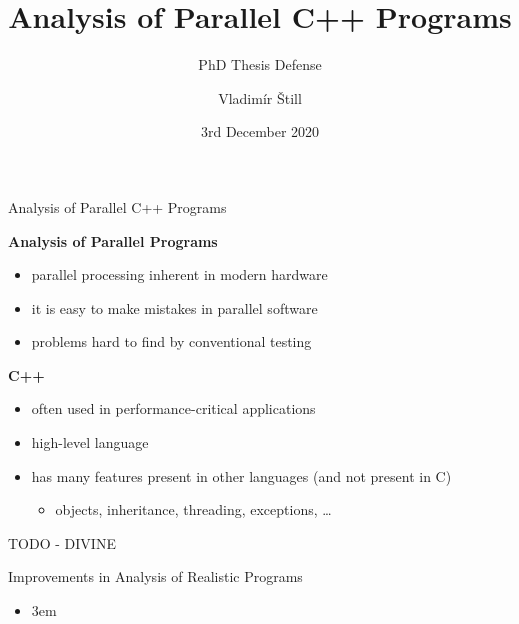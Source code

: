 \documentclass[aspectratio=169]{paradise-slide}
\title{Analysis of Parallel C++ Programs}
\subtitle{PhD Thesis Defense}
\author{Vladimír Štill}
\date{3rd December 2020}
\newcommand{\fcite}[1]{\emergencystretch 3em{\protect\NoHyper\cite{#1}}~\fullcite{#1}}
\newenvironment{prespart}[1]{%
  \begin{frame}{}%
    \centering
      {\Large #1} \par\bigskip\bigskip%
}{%
  \end{frame}%
}
\let\otp\titlepage
\renewcommand{\titlepage}{\otp\addtocounter{framenumber}{-1}}
\begin{document}
\frame[plain]{\titlepage}

\begin{frame}{Analysis of Parallel C++ Programs}

\textbf{Analysis of Parallel Programs}
\begin{itemize}
    \item parallel processing inherent in modern hardware
    \item it is easy to make mistakes in parallel software
    \item problems hard to find by conventional testing
\end{itemize}
\pause

\bigskip
\textbf{C++}
\begin{itemize}
  \item often used in performance-critical applications
  \item high-level language
  \item has many features present in other languages (and not present in C)
    \pause
    \begin{itemize}
      \item objects, inheritance, threading, exceptions, …
    \end{itemize}
\end{itemize}
\end{frame}

\begin{frame}{TODO}
  - DIVINE
\end{frame}

\begin{prespart}{Improvements in Analysis of Realistic Programs}
  \begin{itemize}
    \item \fcite{SRB2017}
  \end{itemize}
\end{prespart}
\end{document}
